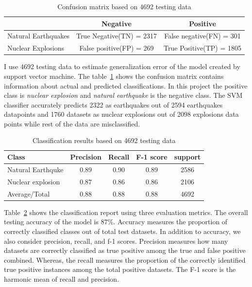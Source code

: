 \documentclass[12pt]{article}
\begin{document}
        \begin{table}[!htb]
            \caption{Confusion matrix based on 4692 testing data} \vspace{0.5em}
            \label{tab:confusion_matrix}
            \centering
            \begin{tabular}{l c c}
            \hline
             & Negative & Positive\\
            \hline
            Natural Earthquakes & True Negative(TN) = 2317 & False negative(FN) = 301 \\
            Nuclear Explosions & False positive(FP) = 269 & True Positive(TP) = 1805 \\
            \hline
            \end{tabular}
        \end{table}
    
        I use 4692 testing data to estimate generalization error of the model created by support vector machine. The table~\ref{tab:confusion_matrix} shows the confusion matrix contains information about actual and predicted classifications. In this project the positive class is \textit{nuclear explosion} and \textit{natural earthquake} is the negative class. The SVM classifier accurately predicts 2322 as earthquakes out of 2594 earthquakes datapoints and 1760  datasets as nuclear explosions out of 2098 explosions data points while rest of the data are misclassified.
        
        \begin{table}[!htb]
            \caption{Classification results based on 4692 testing data} \vspace{0.5em}
            \label{tab:classification_report}
            \centering
            \begin{tabular}{l c c c c}
                \hline
                Class & Precision & Recall & F-1 score & support\\
                \hline
                Natural Earthquke & 0.89 & 0.90 & 0.89 & 2586 \\
                Nuclear explosion & 0.87 & 0.86 & 0.86 & 2106\\
                Average/Total & 0.88 & 0.88 & 0.88 &4692\\[1ex]
                \hline
            \end{tabular}
        \end{table}
    
        Table~\ref{tab:classification_report} shows the classification report using three evaluation metrics. The overall testing accuracy of the model is $87\%$.  Accuracy measures the proportion of correctly classified classes out of total test datasets. In addition to accuracy, we also consider precision, recall, and f-1 scores. Precision measures how many datasets are correctly classified as true positive among the true and false positive combined.  Whereas, the recall measures the proportion of the correctly identified true positive instances among the total positive datasets. The F-1 score is the harmonic mean of recall and precision.
        
\end{document}
